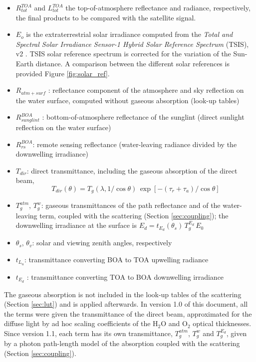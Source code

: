 \documentclass{article}
\begin{document}
\begin{itemize}
    \item \( R_{tot}^{TOA}\) and \(L_{tot}^{TOA}\)  the top-of-atmosphere reflectance and radiance, respectively, the final products to be compared with the satellite signal.
    \item \({E_o}\) is the extraterrestrial solar irradiance computed from the \textit{Total and Spectral Solar Irradiance Sensor-1 Hybrid Solar Reference Spectrum} (TSIS), v2 \cite{Coddington2023}.  TSIS solar reference spectrum is corrected for the variation of the Sun-Earth distance. A comparison between the different solar references is provided  Figure \href{}{\ref{fig:solar_ref}}.

    \item \(R_{atm+surf}\) : reflectance component of the atmosphere and sky reflection on the water surface, computed without gaseous absorption (look-up tables)
    \item \(R_{sunglint}^{BOA}\) : bottom-of-atmosphere reflectance of the sunglint (direct sunlight reflection on the water surface)
    \item \(R_{rs}^{BOA}\): remote sensing reflectance (water-leaving radiance divided by the downwelling irradiance)
    \item \(T_{dir}\):  direct transmittance, including the gaseous absorption of the direct beam,
    \[T_{dir}(\theta) = T_g(\lambda, 1/\cos\theta)\,\exp\left[-(\tau_r + \tau_a)/\cos\theta\right]\]
    \item \(T_g^{atm}\), \(T_g^{w}\): gaseous transmittances of the path reflectance and of the water-leaving term, coupled with the scattering (Section \ref{sec:coupling}); the downwelling irradiance at the surface is \(E_d = t_{E_d}(\theta_s)\,T_g^{E_d}\,E_0\)
    \item \(\theta_s\), \(\theta_v\): solar and viewing zenith angles, respectively
    \item \(t_{L_u}\): transmittance converting BOA to TOA upwelling radiance
    \item \(t_{E_d}\) : transmittance converting TOA to BOA downwelling irradiance
\end{itemize}
The gaseous absorption is not included in the look-up tables of the scattering (Section \ref{sec:lut}) and is applied
afterwards. In version 1.0 of this document, all the terms were given the transmittance of the direct beam, approximated
for the diffuse light by ad hoc scaling coefficients of the H$_2$O and O$_2$ optical thicknesses. Since version 1.1, each
term has its own transmittance, $T_g^{atm}$, $T_g^{w}$ and $T_g^{E_d}$, given by a photon path-length model of the absorption
coupled with the scattering (Section \ref{sec:coupling}).
\end{document}
